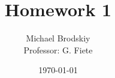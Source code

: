 


\title{Homework 1}
\date{\today}
\author{Michael Brodskiy\\ \small Professor: G. Fiete}



\maketitle


